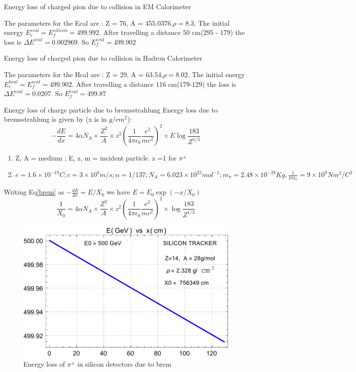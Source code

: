Energy loss of charged pion due to collision in EM Calorimeter

The parameters for the Ecal are : Z = 76, A = 455.0376,$\rho =8.3$. The initial energy $E_i^{ecal} = E_f^{silicon} = 499.992$. After travelling a distance 50 cm(295 - 179) the loss is $\Delta E^{ecal} = 0.002969$. So $E^{ecal}_f = 499.902$

Energy loss of charged pion due to collision in Hadron Calorimeter

The parameters for the Hcal are : Z = 29, A = 63.54,$\rho =8.02$. The initial energy $E_i^{hcal} = E_f^{ecal} =  499.902$. After travelling a distance 116 cm(179-129) the loss is $\Delta E^{ecal} = 0.0207$. So $E^{ecal}_f = 499.87$


Energy loss of charge particle due to bremsstrahlung
Energy loss due to bremsstrahlung is given by (x is in $g/cm^2$):
\begin{equation}
-\frac{dE}{dx} = 4\alpha N_A\times \frac{Z^2}{A}\times z^2
\left( \frac{1}{4\pi \epsilon_0}\frac{e^2}{mc^2} \right)^2 \times E\log \frac{183}{Z^{1/3}}
\label{brem}
\end{equation}
\begin{enumerate}
\item Z, A = medium ; E, z, m = incident particle. z =1 for $\pi^\pm$
\item $e = 1.6\times10^{-19} C; c = 3\times10^8 m/s; \alpha = 1/137; N_A = 6.023\times 10^{23}mol^{-1}; m_\pi = 2.48\times 10^{-28} Kg, \frac{1}{4\pi\epsilon_0} = 9\times10^9 Nm^2/C^2 $
\end{enumerate}
Writing Eq\eqref{brem} as $-\frac{dE}{dx} = E/X_0$ we have $E = E_0 \exp(-x/X_0)$
\begin{equation}
\frac{1}{X_0} = 4\alpha N_A\times \frac{Z^2}{A}\times z^2
\left( \frac{1}{4\pi \epsilon_0}\frac{e^2}{mc^2} \right)^2 \times \log \frac{183}{Z^{1/3}}
\end{equation}

\begin{figure}
    \centering
    \includegraphics[width=0.50\linewidth]{Experiment/CMS/Image/Loss/pion_silicon.pdf}
    \caption{Energy loss of $\pi^{\pm}$ in silicon detectors due to brem}
    \label{fig:silicon}
\end{figure}

